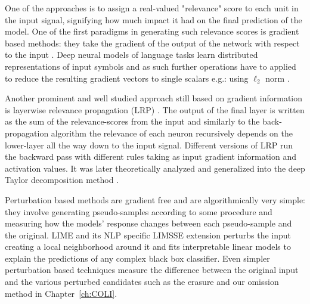 One of the approaches is to assign a real-valued "relevance" score to each unit in the input signal,
signifying how much impact it had on the final prediction of the model.
One of the first paradigms in generating such relevance scores is gradient based methods:
they take the gradient of the output of the network with respect to the input \cite{simonyan2013deep}.
Deep neural models of language tasks learn distributed representations of input symbols
and as such further operations have to applied to reduce the resulting gradient vectors to
single scalars e.g.: using $\ell_2$ norm \citep{bansal2016ask}.

Another prominent and well studied
approach still based on gradient information is layerwise
relevance propagation (LRP) \citep{bach2015pixel}. The output of the final layer
is written as the sum of the relevance-scores from the input and similarly to the back-propagation
algorithm the relevance of each neuron
recursively depends on the lower-layer all the way down to the input signal.
Different versions of LRP run the backward pass with different rules taking as
input gradient information and activation values. It was later theoretically analyzed and generalized
into the deep Taylor decomposition method \citep{binder2016layer}.


Perturbation based methods are gradient free and are algorithmically very simple: they involve generating
pseudo-samples according to some procedure and measuring how the models' response changes
between each pseudo-sample and the original.
LIME \citep{ribeiro2016should} and its NLP specific LIMSSE extension
\citep{poerner2018evaluating} perturbs
the input creating a local neighborhood around it and fits interpretable linear models to explain
the predictions of any complex black box classifier.
Even simpler perturbation based techniques measure the
difference between the original input and the various perturbed candidates such as the erasure
\citep{li2016understanding} and our omission \citep{kadar2017representation} method in Chapter~\ref{ch:COLI}.

